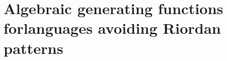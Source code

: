 \documentclass{tufte-book}
\begin{document}
\chapter{Algebraic generating functions for\newline languages avoiding Riordan patterns}
\label{ch:algebraic-gfs-languages-avoiding-Riordan-patterns}




\backmatter

%
%

%

\printindex
\end{document}
